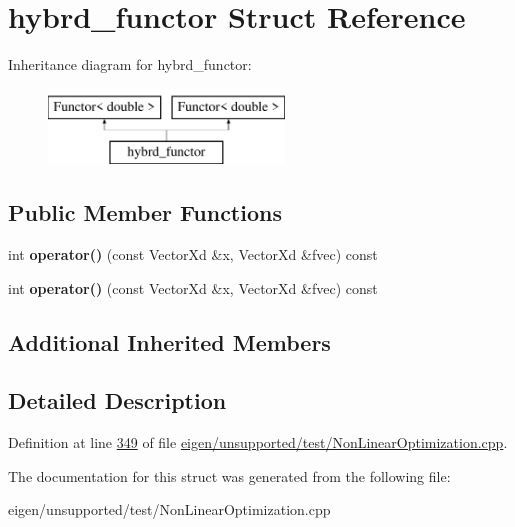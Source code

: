 \hypertarget{structhybrd__functor}{}\section{hybrd\+\_\+functor Struct Reference}
\label{structhybrd__functor}
Inheritance diagram for hybrd\+\_\+functor\+:\begin{figure}[H]
\begin{center}
\leavevmode
\includegraphics[height=2.000000cm]{structhybrd__functor}
\end{center}
\end{figure}
\subsection*{Public Member Functions}
\begin{DoxyCompactItemize}
\item 
\mbox{\label{structhybrd__functor_a51575ceddecd10b92aa64f4a0004e0f6}} 
int {\bfseries operator()} (const Vector\+Xd \&x, Vector\+Xd \&fvec) const
\item 
\mbox{\label{structhybrd__functor_a51575ceddecd10b92aa64f4a0004e0f6}} 
int {\bfseries operator()} (const Vector\+Xd \&x, Vector\+Xd \&fvec) const
\end{DoxyCompactItemize}
\subsection*{Additional Inherited Members}


\subsection{Detailed Description}


Definition at line \hyperlink{eigen_2unsupported_2test_2_non_linear_optimization_8cpp_source_l00349}{349} of file \hyperlink{eigen_2unsupported_2test_2_non_linear_optimization_8cpp_source}{eigen/unsupported/test/\+Non\+Linear\+Optimization.\+cpp}.



The documentation for this struct was generated from the following file\+:\begin{DoxyCompactItemize}
\item 
eigen/unsupported/test/\+Non\+Linear\+Optimization.\+cpp\end{DoxyCompactItemize}
